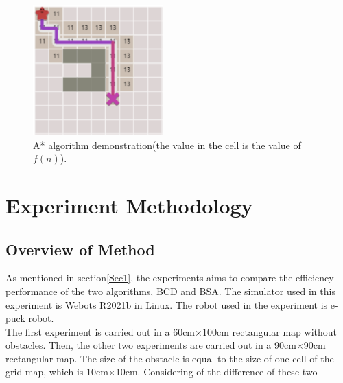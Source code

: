 \documentclass[conference]{IEEEtran}
\begin{document}
\setlength{\belowcaptionskip}{-1cm}
\begin{figure}[htbp]
\centerline{\includegraphics[width=5cm,height=5cm]{RS_Report/astar.png}}
\caption{A* algorithm demonstration(the value in the cell is the value of $f(n)$).}
\label{fig4}
\end{figure}

\section{Experiment Methodology}

\subsection{Overview of Method}
As mentioned in section\ref{Sec1}, the experiments aims to compare the efficiency performance of the two algorithms, BCD and BSA. The simulator used in this experiment is Webots R2021b in Linux. The robot used in the experiment is e-puck robot\cite{Cyberboticswebsite}.\\

The first experiment is carried out in a 60cm$\times$100cm rectangular map without obstacles. Then, the other two experiments are carried out in a 90cm$\times$90cm rectangular map. The size of the obstacle is equal to the size of one cell of the grid map, which is 10cm$\times$10cm. Considering of the difference of these two 
\end{document}
